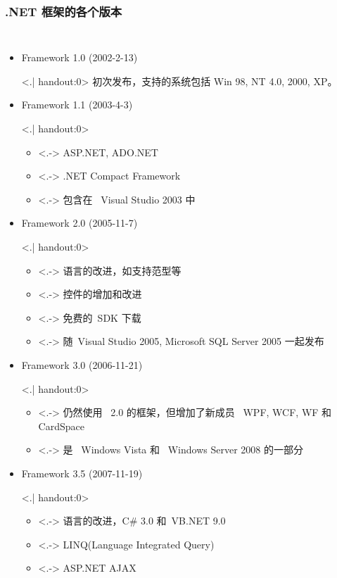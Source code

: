 \begin{frame}
\frametitle{.NET 框架的各个版本}

\begin{columns}[t]
\begin{itemize}[<+->]
\small
\item Framework 1.0 (2002-2-13)

\only<.| handout:0>{ \CJKindent 初次发布，支持的系统包括 Win 98, NT 4.0, 2000, XP。}

\item Framework 1.1 (2003-4-3)

\only<.| handout:0>{
\begin{itemize}
\item<.-> ASP.NET, ADO.NET
\item<.-> .NET Compact Framework
\item<.-> 包含在~ Visual Studio 2003 中
\end{itemize}}

\item Framework 2.0 (2005-11-7)

\only<.| handout:0>{
\begin{itemize}
\item<.-> 语言的改进，如支持范型等
\item<.-> 控件的增加和改进
\item<.-> 免费的~SDK 下载
\item<.-> 随~Visual Studio 2005, Microsoft SQL Server 2005 一起发布
\end{itemize}}

\item Framework 3.0 (2006-11-21)

\only<.| handout:0>{
\begin{itemize}
\item<.-> 仍然使用 ~2.0 的框架，但增加了新成员 ~WPF, WCF, WF 和 CardSpace
\item<.-> 是 ~Windows Vista 和 ~Windows Server 2008 的一部分
\end{itemize}}

\item Framework 3.5 (2007-11-19)

\only<.| handout:0>{
\begin{itemize}
\item<.-> 语言的改进，C\# 3.0 和~VB.NET 9.0
\item<.-> LINQ(Language Integrated Query)
\item<.-> ASP.NET AJAX
\end{itemize}}


\end{itemize}
\end{columns}
\end{frame}

